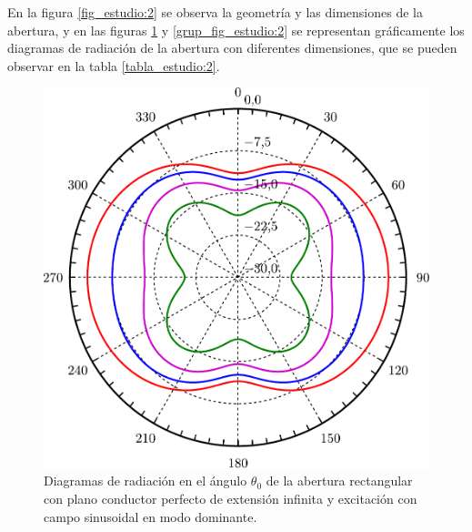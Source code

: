 En la figura \ref{fig_estudio:2} se observa la geometría y las dimensiones de la abertura, y en las figuras \ref{fig_estudio:6} y \ref{grup_fig_estudio:2} se representan gráficamente los diagramas de radiación de la abertura con diferentes dimensiones, que se pueden observar en la tabla \ref{tabla_estudio:2}.
\begin{figure}[H]
\centering
\includegraphics[scale = 0.5]{Figures/Estudio/estudio_6}
\caption{Diagramas de radiación en el ángulo $\theta_0$ de la abertura rectangular con plano conductor perfecto de extensión infinita y excitación con campo sinusoidal en modo dominante.}
\label{fig_estudio:6}
\end{figure}
